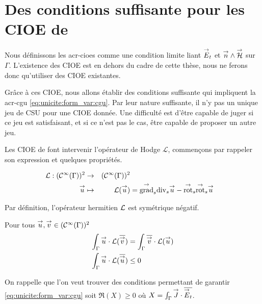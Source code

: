 \section[Des CSU pour les CIOE de Stupfel et Poget 2011]{Des conditions suffisante pour les CIOE de \cite{stupfel_sufficient_2011}}

  Nous définissons les \glspl{acr-cioe} comme une condition limite liant \({\overset{\rightarrow}{E}}_t\) et \({\overset{\rightarrow}{n}}\wedge{\overset{\rightarrow}{\mathcal{H}}}\) sur \(\Gamma\). L'existence des CIOE est en dehors du cadre de cette thèse, nous ne ferons donc qu'utiliser des CIOE existantes.

  Grâce à ces CIOE, nous allons établir des conditions suffisante qui impliquent la \gls{acr-cgu} \eqref{eq:unicite:form_var:cgu}. Par leur nature suffisante, il n'y pas un unique jeu de CSU pour une CIOE donnée. Une difficulté est d'être capable de juger si ce jeu est satisfaisant, et si ce n'est pas le cas, être capable de proposer un autre jeu.

  Les CIOE de \cite{stupfel_sufficient_2011} font intervenir l'opérateur de Hodge \(\mathcal{L}\), commençons par rappeler son expression et quelques propriétés.

  \begin{defn}
    \begin{equation}
      \begin{aligned}
        \mathcal{L}:(\mathcal{C}^\infty(\Gamma))^2 & \rightarrow & (\mathcal{C}^\infty(\Gamma))^2
        \\
        {\overset{\rightarrow}{u}} & \mapsto & \mathcal{L}({\overset{\rightarrow}{u}}) & = {{\overset{\rightarrow}{\operatorname{grad}}}_s}{{\operatorname{div}_s} {\overset{\rightarrow}{u}}} - {{\overset{\rightarrow}{\operatorname{rot}}}_s}{{{\overset{\rightarrow}{\operatorname{rot}}}_s} {\overset{\rightarrow}{u}}}
      \end{aligned}
    \end{equation}
  \end{defn}

  \begin{prop}
    Par définition, l’opérateur hermitien \(\mathcal{L}\) est symétrique négatif.

    Pour tous \({\overset{\rightarrow}{u}},{\overset{\rightarrow}{v}} \in (\mathcal C^\infty(\Gamma))^2\)
    \begin{align}
      \int_\Gamma {\overset{\rightarrow}{u}}\cdot \mathcal{L}({\overline{{\overset{\rightarrow}{v}}}}) &= \int_\Gamma {\overline{{\overset{\rightarrow}{v}}}}\cdot \mathcal{L}({\overset{\rightarrow}{u}})
      \\
      \int_\Gamma {\overset{\rightarrow}{u}}\cdot \mathcal{L}({\overline{{\overset{\rightarrow}{u}}}}) &\le 0
      \label{eq:hodge:negatif}
    \end{align}
  \end{prop}

  On rappelle que l'on veut trouver des conditions permettant de garantir \eqref{eq:unicite:form_var:cgu} soit \(\Re(X)\ge0\) où \(X = \int_\Gamma {\overset{\rightarrow}{J}} \cdot {\overline{{\overset{\rightarrow}{E}}_t}}\).

